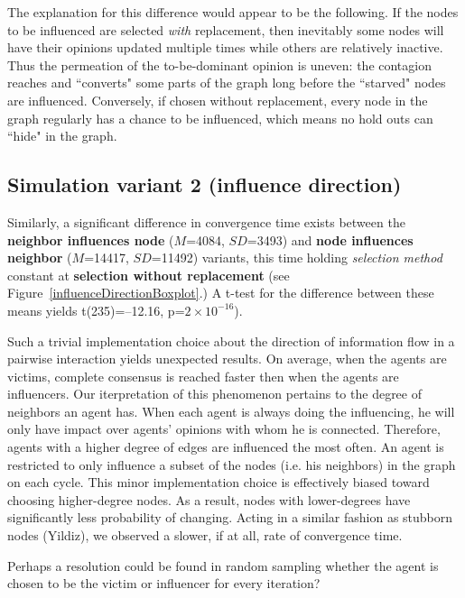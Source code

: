 The explanation for this difference would appear to be the following. If the
nodes to be influenced are selected \textit{with} replacement, then inevitably
some nodes will have their opinions updated multiple times while others are
relatively inactive. Thus the permeation of the to-be-dominant opinion is
uneven: the contagion reaches and ``converts" some parts of the graph long
before the ``starved" nodes are influenced. Conversely, if chosen without
replacement, every node in the graph regularly has a chance to be influenced,
which means no hold outs can ``hide" in the graph.





\subsection{Simulation variant 2 (influence direction)}

Similarly, a significant difference in convergence time exists between the
\textbf{neighbor influences node} ($M$=4084, $SD$=3493) and \textbf{node
influences neighbor} ($M$=14417, $SD$=11492) variants, this time holding
\textsl{selection method} constant at \textbf{selection without replacement}
(see Figure~\ref{influenceDirectionBoxplot}.) A t-test for the difference
between these means yields t(235)=--12.16, p=$2\times 10^{-16}$).

Such a trivial implementation choice about the direction of information flow 
in a pairwise interaction yields unexpected results. On average, when the 
agents are victims, complete consensus is reached faster then when the agents
are influencers. Our iterpretation of this phenomenon pertains to the degree
of neighbors an agent has. When each agent is always doing the influencing, 
he will only have impact over agents' opinions with whom he is connected. 
Therefore, agents with a higher degree of edges are influenced the most
often. An agent is restricted to only influence a subset of the nodes
(i.e. his neighbors) in the graph on each cycle. This minor implementation
choice is effectively biased toward choosing higher-degree nodes. As a result,
nodes with lower-degrees have significantly less probability of changing. 
Acting in a similar fashion as stubborn nodes (Yildiz), we observed a slower, 
if at all, rate of convergence time.

Perhaps a resolution could be found in random sampling whether the agent is chosen 
to be the victim or influencer for every iteration?


